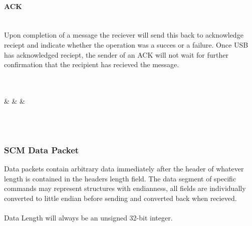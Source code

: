 \documentclass[pstricks,border=12pt,10pt]{article}
\begin{document}
	\paragraph{ACK} \mbox{}\\
	Upon completion of a message the reciever will send this back to acknowledge reciept and indicate whether the operation was a succes or a failure. Once USB has acknowledged reciept, the sender of an ACK will not wait for further confirmation that the recipient has recieved the message. \\
	\\
	\begin{bytefield}[bitwidth=1.1em]{32}
	 \\
	 &
	 &
	 &
	 \\
	\\
	\end{bytefield}\\
	\subsubsection{SCM Data Packet} \mbox{}
	Data packets contain arbitrary data immediately after the header of whatever length is contained in the headers length field. 
	The data segment of specific commands may represent structures with endianness, all fields are individually converted to little endian 
	before sending and converted back when recieved. \\
	\\
	Data Length will always be an unsigned 32-bit integer. 
\end{document}
